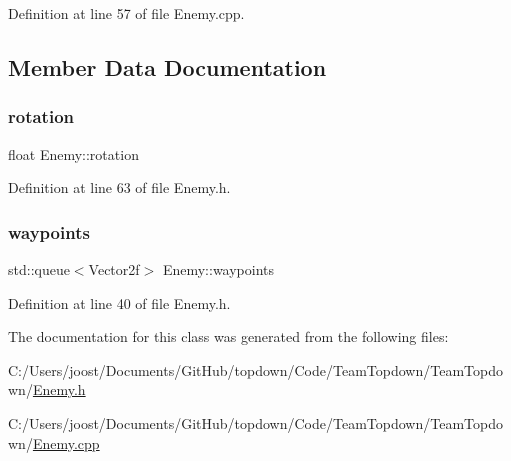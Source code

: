 Definition at line 57 of file Enemy.\+cpp.



\subsection{Member Data Documentation}
\mbox{\label{class_enemy_af0b960378e5235ef1e46a4ecdd85674d}} 
\subsubsection{\texorpdfstring{rotation}{rotation}}
{\footnotesize\ttfamily float Enemy\+::rotation}



Definition at line 63 of file Enemy.\+h.

\mbox{\label{class_enemy_a0265035a86653dde11df05cd8f0ceaa5}} 
\subsubsection{\texorpdfstring{waypoints}{waypoints}}
{\footnotesize\ttfamily std\+::queue$<$Vector2f$>$ Enemy\+::waypoints}



Definition at line 40 of file Enemy.\+h.



The documentation for this class was generated from the following files\+:\begin{DoxyCompactItemize}
\item 
C\+:/\+Users/joost/\+Documents/\+Git\+Hub/topdown/\+Code/\+Team\+Topdown/\+Team\+Topdown/\hyperlink{_enemy_8h}{Enemy.\+h}\item 
C\+:/\+Users/joost/\+Documents/\+Git\+Hub/topdown/\+Code/\+Team\+Topdown/\+Team\+Topdown/\hyperlink{_enemy_8cpp}{Enemy.\+cpp}\end{DoxyCompactItemize}
